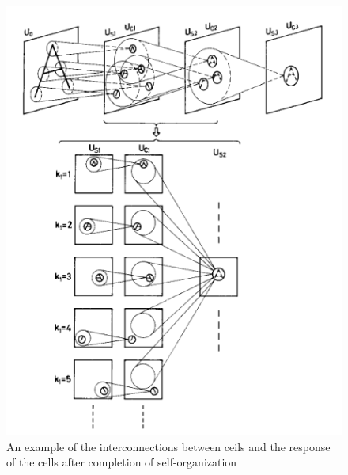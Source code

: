 \documentclass[12pt, letterpaper]{article}
\begin{document}
\begin{figure}[H]
    \includegraphics[width=\linewidth]{img/fig4.png}
    \caption{An example of the interconnections between ceils and the response of the cells after completion of self-organization}
    \label{fig:L4}
\end{figure}
\end{document}
